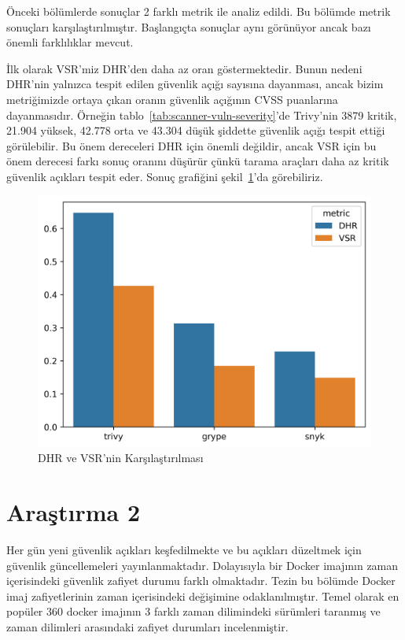Önceki bölümlerde sonuçlar 2 farklı metrik ile analiz edildi. Bu bölümde metrik sonuçları karşılaştırılmıştır. Başlangıçta sonuçlar aynı görünüyor ancak bazı önemli farklılıklar mevcut.

İlk olarak VSR'miz DHR'den daha az oran göstermektedir. Bunun nedeni DHR'nin yalnızca tespit edilen güvenlik açığı sayısına dayanması, ancak bizim metriğimizde ortaya çıkan oranın güvenlik açığının CVSS puanlarına dayanmasıdır. Örneğin tablo~\ref{tab:scanner-vuln-severity}'de Trivy'nin 3879 kritik, 21.904 yüksek, 42.778 orta ve 43.304 düşük şiddette güvenlik açığı tespit ettiği görülebilir. Bu önem dereceleri DHR için önemli değildir, ancak VSR için bu önem derecesi farkı sonuç oranını düşürür çünkü tarama araçları daha az kritik güvenlik açıkları tespit eder. Sonuç grafiğini şekil~\ref{fig:comparison-dhr-vsr}'da görebiliriz.

\begin{figure}
    \centering
    \includegraphics[width=1\linewidth]{images/s1/comparison-dhr-vsr.png}
    \caption{DHR ve VSR'nin Karşılaştırılması}\label{fig:comparison-dhr-vsr}
\end{figure}

\chapter{Araştırma 2}\label{ch:arastirma2}

Her gün yeni güvenlik açıkları keşfedilmekte ve bu açıkları düzeltmek için güvenlik güncellemeleri yayınlanmaktadır. Dolayısıyla bir Docker imajının zaman içerisindeki güvenlik zafiyet durumu farklı olmaktadır. Tezin bu bölümde Docker imaj zafiyetlerinin zaman içerisindeki değişimine odaklanılmıştır. Temel olarak en popüler 360 docker imajının 3 farklı zaman dilimindeki sürümleri taranmış ve zaman dilimleri arasındaki zafiyet durumları incelenmiştir.

